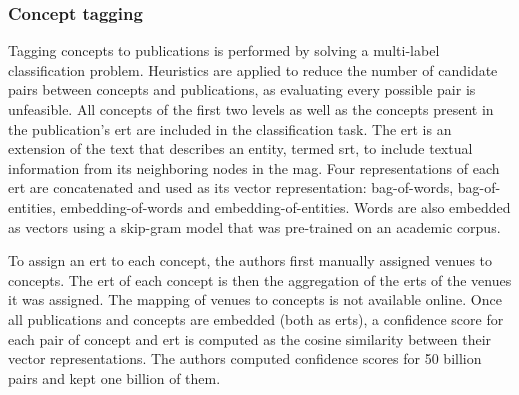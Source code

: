 \subsubsection{Concept tagging} \label{mag_concept_tagging}

Tagging concepts to publications is performed by solving a multi-label classification problem. Heuristics are applied to reduce the number of candidate pairs between concepts and publications, as evaluating every possible pair is unfeasible. All concepts of the first two levels as well as the concepts present in the publication's \acrfull{ert} are included in the classification task. The \acrshort{ert} is an extension of the text that describes an entity, termed \acrfull{srt}, to include textual information from its neighboring nodes in the \acrshort{mag}. Four representations of each \acrshort{ert} are concatenated and used as its vector representation: bag-of-words, bag-of-entities, embedding-of-words and embedding-of-entities. Words are also embedded as vectors using a skip-gram model \cite{mikolov2013distributed} that was pre-trained on an academic corpus.

To assign an \acrshort{ert} to each concept, the authors first manually assigned venues to concepts. The \acrshort{ert} of each concept is then the aggregation of the \acrshort{ert}s of the venues it was assigned. The mapping of venues to concepts is not available online. Once all publications and concepts are embedded (both as \acrshort{ert}s), a confidence score for each pair of concept and \acrshort{ert} is computed as the cosine similarity between their vector representations. The authors computed confidence scores for 50 billion pairs and kept one billion of them.